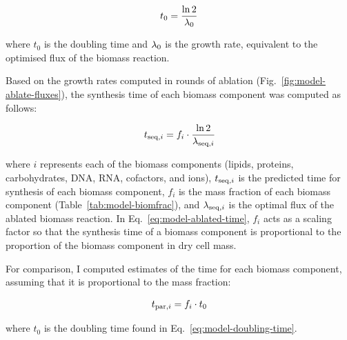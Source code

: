 \begin{equation}
  t_{0} = \frac{\ln 2}{\lambda_{0}}
  \label{eq:model-doubling-time}
\end{equation}

where $t_{0}$ is the doubling time and $\lambda_{0}$ is the growth rate, equivalent to the optimised flux of the biomass reaction.

Based on the growth rates computed in rounds of ablation (Fig.\ \ref{fig:model-ablate-fluxes}), the synthesis time of each biomass component was computed as follows:

\begin{equation}
  t_{\mathrm{seq},i} = f_{i} \cdot \frac{\ln 2}{\lambda_{\mathrm{seq},i}}
  \label{eq:model-ablated-time}
\end{equation}

where
$i$ represents each of the biomass components (lipids, proteins, carbohydrates, DNA, RNA, cofactors, and ions),
$t_{\mathrm{seq},i}$ is the predicted time for synthesis of each biomass component,
$f_{i}$ is the mass fraction of each biomass component (Table~\ref{tab:model-biomfrac}), and
$\lambda_{\mathrm{seq},i}$ is the optimal flux of the ablated biomass reaction.
In Eq.\ \ref{eq:model-ablated-time}, $f_{i}$ acts as a scaling factor so that the synthesis time of a biomass component is proportional to the proportion of the biomass component in dry cell mass.

For comparison, I computed estimates of the time for each biomass component, assuming that it is proportional to the mass fraction:

\begin{equation}
  t_{\mathrm{par},i} = f_{i} \cdot t_{0}
  \label{eq:model-proportional-time}
\end{equation}

where $t_{0}$ is the doubling time found in Eq.\ \ref{eq:model-doubling-time}.


